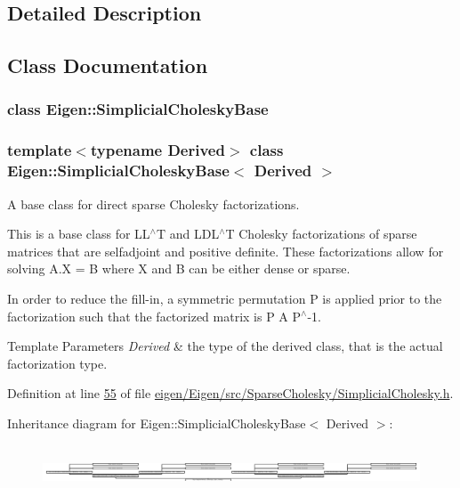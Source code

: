 \subsection{Detailed Description}


\subsection{Class Documentation}
\label{class_eigen_1_1_simplicial_cholesky_base}
\subsubsection{class Eigen\+:\+:Simplicial\+Cholesky\+Base}
\subsubsection*{template$<$typename Derived$>$\newline
class Eigen\+::\+Simplicial\+Cholesky\+Base$<$ Derived $>$}

A base class for direct sparse Cholesky factorizations. 

This is a base class for L\+L$^\wedge$T and L\+D\+L$^\wedge$T Cholesky factorizations of sparse matrices that are selfadjoint and positive definite. These factorizations allow for solving A.\+X = B where X and B can be either dense or sparse.

In order to reduce the fill-\/in, a symmetric permutation P is applied prior to the factorization such that the factorized matrix is P A P$^\wedge$-\/1.


\begin{DoxyTemplParams}{Template Parameters}
{\em Derived} & the type of the derived class, that is the actual factorization type. \\
\hline
\end{DoxyTemplParams}


Definition at line \hyperlink{eigen_2_eigen_2src_2_sparse_cholesky_2_simplicial_cholesky_8h_source_l00055}{55} of file \hyperlink{eigen_2_eigen_2src_2_sparse_cholesky_2_simplicial_cholesky_8h_source}{eigen/\+Eigen/src/\+Sparse\+Cholesky/\+Simplicial\+Cholesky.\+h}.

Inheritance diagram for Eigen\+:\+:Simplicial\+Cholesky\+Base$<$ Derived $>$\+:\begin{figure}[H]
\begin{center}
\leavevmode
\includegraphics[height=1.615385cm]{group___sparse_cholesky___module}
\end{center}
\end{figure}
